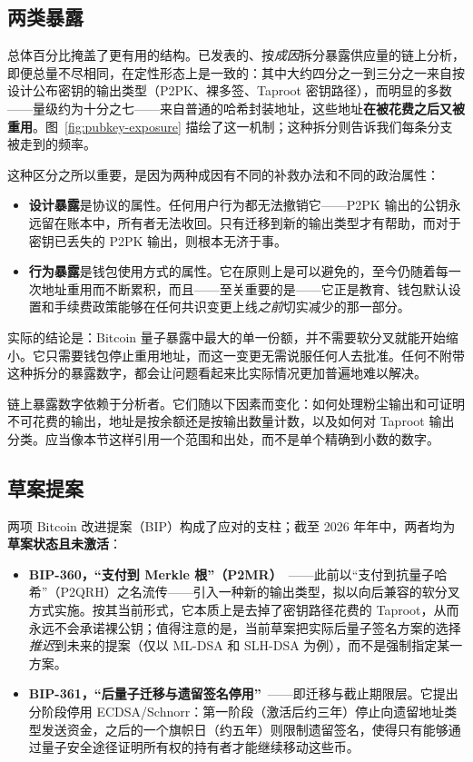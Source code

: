 \subsection{两类暴露}
\label{sec:two-exposures}

总体百分比掩盖了更有用的结构。已发表的、按\emph{成因}拆分暴露供应量的链上分析，即便总量不尽相同，在定性形态上是一致的：其中大约四分之一到三分之一来自按设计公布密钥的输出类型（P2PK、裸多签、Taproot 密钥路径），而明显的多数——量级约为十分之七——来自普通的哈希封装地址，这些地址\textbf{在被花费之后又被重用}。图~\ref{fig:pubkey-exposure} 描绘了这一机制；这种拆分则告诉我们每条分支被走到的频率。

这种区分之所以重要，是因为两种成因有不同的补救办法和不同的政治属性：

\begin{itemize}
  \item \textbf{设计暴露}是协议的属性。任何用户行为都无法撤销它——P2PK 输出的公钥永远留在账本中，所有者无法收回。只有迁移到新的输出类型才有帮助，而对于密钥已丢失的 P2PK 输出，则根本无济于事。
  \item \textbf{行为暴露}是钱包使用方式的属性。它在原则上是可以避免的，至今仍随着每一次地址重用而不断累积，而且——至关重要的是——它正是教育、钱包默认设置和手续费政策能够在任何共识变更上线\emph{之前}切实减少的那一部分。
\end{itemize}

实际的结论是：Bitcoin 量子暴露中最大的单一份额，并不需要软分叉就能开始缩小。它只需要钱包停止重用地址，而这一变更无需说服任何人去批准。任何不附带这种拆分的暴露数字，都会让问题看起来比实际情况更加普遍地难以解决。

\begin{remark}[解读暴露统计数据]
链上暴露数字依赖于分析者。它们随以下因素而变化：如何处理粉尘输出和可证明不可花费的输出，地址是按余额还是按输出数量计数，以及如何对 Taproot 输出分类。应当像本节这样引用一个范围和出处，而不是单个精确到小数的数字。
\end{remark}

\subsection{草案提案}
两项 Bitcoin 改进提案（BIP）构成了应对的支柱；截至 2026 年年中，两者均为\textbf{草案状态且未激活}：

\begin{itemize}
  \item \textbf{BIP-360，“支付到 Merkle 根”（P2MR）}~\cite{bip360}——此前以“支付到抗量子哈希”（P2QRH）之名流传——引入一种新的输出类型，拟以向后兼容的软分叉方式实施。按其当前形式，它本质上是去掉了密钥路径花费的 Taproot，从而永远不会承诺裸公钥；值得注意的是，当前草案把实际后量子签名方案的选择\emph{推迟}到未来的提案（仅以 ML-DSA 和 SLH-DSA 为例），而不是强制指定某一方案。
  \item \textbf{BIP-361，“后量子迁移与遗留签名停用”}~\cite{bip361}——即迁移与截止期限层。它提出分阶段停用 ECDSA/Schnorr：第一阶段（激活后约三年）停止向遗留地址类型发送资金，之后的一个旗帜日（约五年）则限制遗留签名，使得只有能够通过量子安全途径证明所有权的持有者才能继续移动这些币。
\end{itemize}

